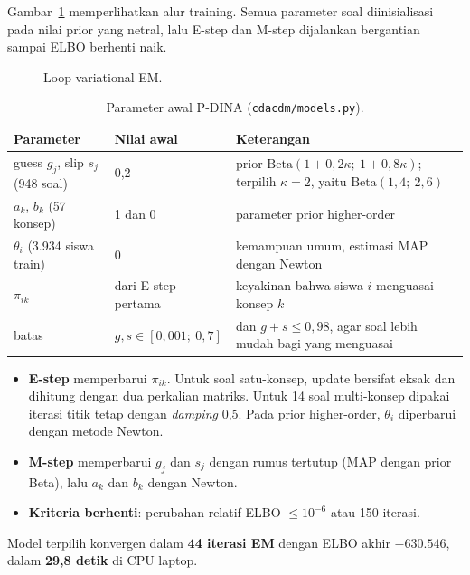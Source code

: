 \documentclass[11pt,a4paper]{article}
\begin{document}
Gambar~\ref{fig:em} memperlihatkan alur training. Semua parameter soal diinisialisasi pada nilai prior yang netral,
lalu E-step dan M-step dijalankan bergantian sampai ELBO berhenti naik.

\begin{figure}[h]
  \centering
  \resizebox{0.95\linewidth}{!}{}
  \caption{Loop variational EM.}
  \label{fig:em}
\end{figure}

\begin{table}[h]
  \centering\small
  \begin{tabularx}{\linewidth}{@{}l l L@{}}
    \toprule
    Parameter & Nilai awal & Keterangan \\
    \midrule
    guess $g_j$, slip $s_j$ (948 soal) & 0,2 & prior $\mathrm{Beta}(1+0{,}2\kappa;\ 1+0{,}8\kappa)$; terpilih $\kappa=2$, yaitu $\mathrm{Beta}(1{,}4;\ 2{,}6)$ \\
    $a_k$, $b_k$ (57 konsep) & 1 dan 0 & parameter prior higher-order \\
    $\theta_i$ (3.934 siswa train) & 0 & kemampuan umum, estimasi MAP dengan Newton \\
    $\pi_{ik}$ & dari E-step pertama & keyakinan bahwa siswa $i$ menguasai konsep $k$ \\
    batas & $g,s\in[0{,}001;\ 0{,}7]$ & dan $g+s\le0{,}98$, agar soal lebih mudah bagi yang menguasai \\
    \bottomrule
  \end{tabularx}
  \caption{Parameter awal P-DINA (\texttt{cdacdm/models.py}).}
\end{table}

\begin{itemize}
  \item \textbf{E-step} memperbarui $\pi_{ik}$. Untuk soal satu-konsep, update bersifat eksak dan dihitung dengan dua
        perkalian matriks. Untuk 14 soal multi-konsep dipakai iterasi titik tetap dengan \emph{damping} 0,5. Pada prior
        higher-order, $\theta_i$ diperbarui dengan metode Newton.
  \item \textbf{M-step} memperbarui $g_j$ dan $s_j$ dengan rumus tertutup (MAP dengan prior Beta), lalu $a_k$ dan $b_k$
        dengan Newton.
  \item \textbf{Kriteria berhenti}: perubahan relatif ELBO $\le10^{-6}$ atau 150 iterasi.
\end{itemize}

Model terpilih konvergen dalam \textbf{44 iterasi EM} dengan ELBO akhir $-630.546$, dalam \textbf{29,8 detik} di CPU
laptop.
\end{document}
